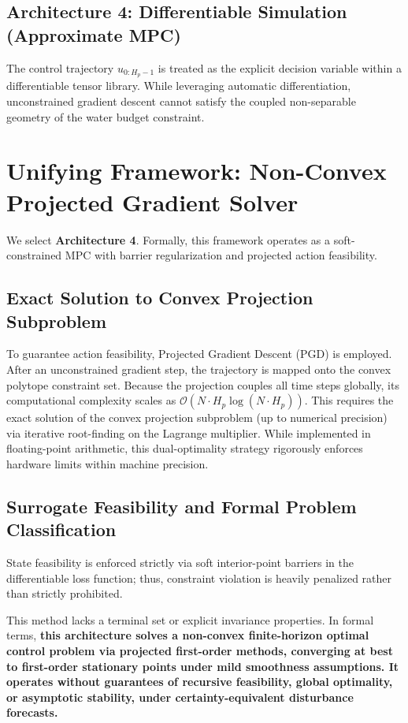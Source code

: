 \documentclass[11pt, a4paper]{article}
\begin{document}
\subsection{Architecture 4: Differentiable Simulation (Approximate MPC)}
The control trajectory $u_{0:H_p-1}$ is treated as the explicit decision variable within a differentiable tensor library. While leveraging automatic differentiation, unconstrained gradient descent cannot satisfy the coupled non-separable geometry of the water budget constraint.

\section{Unifying Framework: Non-Convex Projected Gradient Solver}
\label{sec:selected}
We select \textbf{Architecture 4}. Formally, this framework operates as a soft-constrained MPC with barrier regularization and projected action feasibility.

\subsection{Exact Solution to Convex Projection Subproblem}
To guarantee action feasibility, Projected Gradient Descent (PGD) is employed. After an unconstrained gradient step, the trajectory is mapped onto the convex polytope constraint set. Because the projection couples all time steps globally, its computational complexity scales as $\mathcal{O}(N \cdot H_p \log(N \cdot H_p))$. This requires the exact solution of the convex projection subproblem (up to numerical precision) via iterative root-finding on the Lagrange multiplier. While implemented in floating-point arithmetic, this dual-optimality strategy rigorously enforces hardware limits within machine precision.

\subsection{Surrogate Feasibility and Formal Problem Classification}
State feasibility is enforced strictly via soft interior-point barriers in the differentiable loss function; thus, constraint violation is heavily penalized rather than strictly prohibited. 

This method lacks a terminal set or explicit invariance properties. In formal terms, \textbf{this architecture solves a non-convex finite-horizon optimal control problem via projected first-order methods, converging at best to first-order stationary points under mild smoothness assumptions. It operates without guarantees of recursive feasibility, global optimality, or asymptotic stability, under certainty-equivalent disturbance forecasts.}
\end{document}
